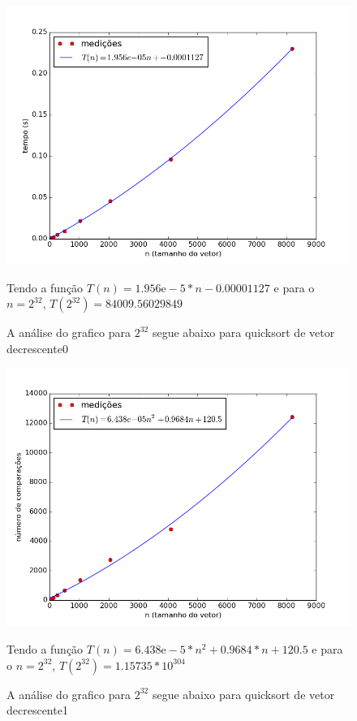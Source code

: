 \documentclass[12pt,a4paper,twoside]{report}
\begin{document}


\begin{figure}[ht]
\centering \includegraphics[scale=0.8]{../quicksort/imagens/quicksortDecrescente0.png}
\caption{A análise do grafico para $2^{32}$ segue abaixo para quicksort de vetor decrescente0}
Tendo a função $T(n) = 1.956\mathrm{e}-5*n-0.00001127$ e para o $n =2^{32}$, $T(2^{32}) = 84009.56029849$ 
\label{fig:quicksortDecrescente0}
\end{figure}

\begin{figure}[ht]
\centering \includegraphics[scale=0.8]{../quicksort/imagens/quicksortDecrescente1.png}
\caption{A análise do grafico para $2^{32}$ segue abaixo para quicksort de vetor decrescente1}
Tendo a função $T(n) = 6.438\mathrm{e}-5*n^2+0.9684*n +120.5$ e para o $n =2^{32}$, $T(2^{32}) = 1.15735* 10^{304}$ 
\label{fig:quicksortDecrescente1}
\end{figure}
\end{document}
